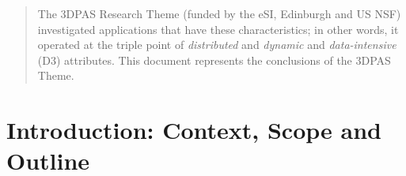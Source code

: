\begin{abstract}


The 3DPAS Research Theme (funded by the eSI, Edinburgh and US NSF)
investigated applications that have these characteristics; in other
words, it operated at the triple point of  {\it distributed} and {\it dynamic} and
{\it data-intensive} (D3) attributes.  This document represents the conclusions
of the 3DPAS Theme.
\end{abstract}
\maketitle


\ifdraft
\newpage
\tableofcontents
\newpage
\fi

%

\section{Introduction: Context, Scope and Outline}


